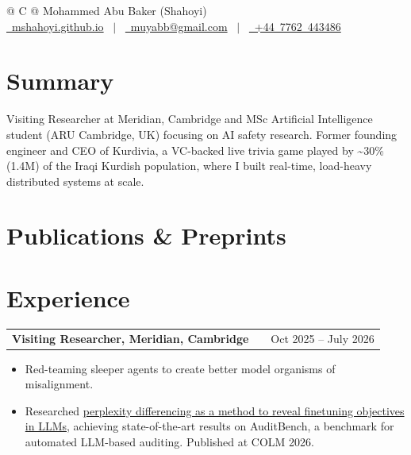 \documentclass[a4paper,12pt]{article}
\makeatletter
\newenvironment{joblong}[2]
    {
    \begin{tabularx}{\linewidth}{@{}l X r@{}}
    \textbf{#1} & \hfill &  #2 \\[3.75pt]
    \end{tabularx}
    \begin{minipage}[t]{\linewidth}
    \begin{itemize}[nosep,after=\strut, leftmargin=1em, itemsep=3pt,label=--]
    }
    {
    \end{itemize}
    \end{minipage}    
    }
\makeatother
\begin{document}
\pagestyle{empty} 


\begin{tabularx}{\linewidth}{@{} C @{}}
\Huge{Mohammed Abu Baker (Shahoyi)} \\[7.5pt]
\href{https://mshahoyi.github.io}{\raisebox{-0.05\height}\faGlobe \ mshahoyi.github.io} \ $|$ \ 
\href{mailto:muyabb@gmail.com}
{\raisebox{-0.05\height}\faEnvelope \ muyabb@gmail.com} \ $|$ \ 
\href{tel:+447762443486}{\raisebox{-0.05\height}\faMobile \ +44\ 7762\ 443486} \\
\end{tabularx}


\section{Summary}
Visiting Researcher at Meridian, Cambridge and MSc Artificial Intelligence student (ARU Cambridge, UK) focusing on AI safety research. Former founding engineer and CEO of Kurdivia, a VC-backed live trivia game played by \textasciitilde30\% (1.4M) of the Iraqi Kurdish population, where I built real-time, load-heavy distributed systems at scale.


\section{Publications \& Preprints}
\begin{refsection}[citations.bib]
\nocite{*}
\printbibliography[heading=none]
\end{refsection}

\section{Experience}

\begin{joblong}{Visiting Researcher, Meridian, Cambridge}{Oct 2025 -- July 2026}

\item Red-teaming sleeper agents to create better model organisms of misalignment.
\item Researched \href{https://arxiv.org/abs/2605.00994}{perplexity differencing as a method to reveal finetuning objectives in LLMs}, achieving state-of-the-art results on AuditBench, a benchmark for automated LLM-based auditing. Published at COLM 2026.

\end{joblong}
\end{document}
